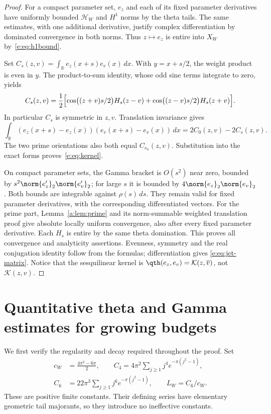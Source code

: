\documentclass[11pt,a4paper]{article}
\numberwithin{equation}{section}
\theoremstyle{definition}\newtheorem{definition}[theorem]{Definition}
\theoremstyle{remark}\newtheorem{remark}[theorem]{Remark}
\newcommand{\R}{\mathbb R}\newcommand{\C}{\mathbb C}\newcommand{\N}{\mathbb N}
\newcommand{\HH}{\mathcal H_W}\newcommand{\XX}{X_W}\newcommand{\EE}{\mathcal E_{N,\beta}}
\begin{document}
\begin{proof}
For a compact parameter set, $e_z$ and each of its fixed parameter
derivatives have uniformly bounded $\HH$ and $H^1$ norms by the theta
tails. The same estimates, with one additional derivative, justify
complex differentiation by dominated convergence in both norms. Thus
$z\mapsto e_z$ is entire into $\XX$ by~\eqref{e:eq:h1bound}.

Set $C_s(z,v)=\int_\R e_z(x+s)e_v(x)\,dx$. With $y=x+s/2$, the weight
product is even in $y$. The product-to-sum identity, whose odd sine terms
integrate to zero, yields
\begin{equation}\label{e:eq:Cs}
 C_s(z,v)=\frac12\Bigl[
 \cos\bigl((z+v)s/2\bigr)H_s(z-v)
 +\cos\bigl((z-v)s/2\bigr)H_s(z+v)\Bigr].
\end{equation}
In particular $C_s$ is symmetric in $z,v$. Translation invariance gives
\[
 \int_\R(e_z(x+s)-e_z(x))(e_v(x+s)-e_v(x))\,dx
 =2C_0(z,v)-2C_s(z,v).
\]
The two prime orientations also both equal $C_{s_n}(z,v)$.
Substitution into the exact forms proves~\eqref{e:eq:kernel}.

On compact parameter sets, the Gamma bracket is $O(s^2)$ near zero,
bounded by $s^2\norm{e_z'}_2\norm{e_v'}_2$; for large $s$ it is bounded
by $4\norm{e_z}_2\norm{e_v}_2$. Both bounds are integrable against
$\rho(s)\,ds$. They remain valid for fixed parameter derivatives, with
the corresponding differentiated vectors. For the prime part,
Lemma~\ref{a:lem:prime} and its norm-summable weighted translation proof give absolute
locally uniform convergence, also after every fixed parameter derivative.
Each $H_s$ is entire by the same theta domination. This proves all
convergence and analyticity assertions. Evenness, symmetry and the real
conjugation identity follow from the formulas; differentiation gives
\eqref{e:eq:jet-matrix}. Notice that the sesquilinear kernel is
$\qth(e_z,e_v)=\mathcal K(z,\overline v)$, not $\mathcal K(z,v)$.
\end{proof}





\section{Quantitative theta and Gamma estimates for growing budgets}\label{sw:sec:theta}
We first verify the regularity and decay required throughout the proof. Set
\begin{equation}\label{sw:eq:theta-constants}
 \begin{split}
 c_W&=\frac{4\pi^2-6\pi}{2},\qquad
 C_4=4\pi^2\sum_{j\ge1}j^4e^{-\pi(j^2-1)},\\
 C_6&=22\pi^3\sum_{j\ge1}j^6e^{-\pi(j^2-1)},\qquad L_W=C_6/c_W.
 \end{split}
\end{equation}
These are positive finite constants. Their defining series have elementary geometric tail majorants, so they introduce no ineffective constants.
\end{document}
